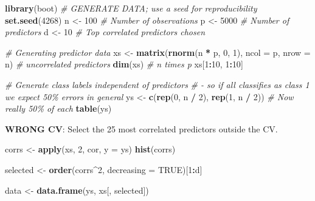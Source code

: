 \documentclass[
]{article}
\newenvironment{Shaded}{\begin{snugshade}}{\end{snugshade}}
\newcommand{\AttributeTok}[1]{\textcolor[rgb]{0.13,0.29,0.53}{#1}}
\newcommand{\CommentTok}[1]{\textcolor[rgb]{0.56,0.35,0.01}{\textit{#1}}}
\newcommand{\ConstantTok}[1]{\textcolor[rgb]{0.56,0.35,0.01}{#1}}
\newcommand{\DecValTok}[1]{\textcolor[rgb]{0.00,0.00,0.81}{#1}}
\newcommand{\FunctionTok}[1]{\textcolor[rgb]{0.13,0.29,0.53}{\textbf{#1}}}
\newcommand{\NormalTok}[1]{#1}
\newcommand{\OtherTok}[1]{\textcolor[rgb]{0.56,0.35,0.01}{#1}}
\newcommand{\SpecialCharTok}[1]{\textcolor[rgb]{0.81,0.36,0.00}{\textbf{#1}}}
\begin{document}
\begin{Shaded}
\begin{Highlighting}[]
\FunctionTok{library}\NormalTok{(boot)}
\CommentTok{\# GENERATE DATA; use a seed for reproducibility}
\FunctionTok{set.seed}\NormalTok{(}\DecValTok{4268}\NormalTok{)}
\NormalTok{n }\OtherTok{\textless{}{-}} \DecValTok{100} \CommentTok{\# Number of observations}
\NormalTok{p }\OtherTok{\textless{}{-}} \DecValTok{5000} \CommentTok{\# Number of predictors}
\NormalTok{d }\OtherTok{\textless{}{-}} \DecValTok{10} \CommentTok{\# Top correlated predictors chosen}

\CommentTok{\# Generating predictor data}
\NormalTok{xs }\OtherTok{\textless{}{-}} \FunctionTok{matrix}\NormalTok{(}\FunctionTok{rnorm}\NormalTok{(n }\SpecialCharTok{*}\NormalTok{ p, }\DecValTok{0}\NormalTok{, }\DecValTok{1}\NormalTok{), }\AttributeTok{ncol =}\NormalTok{ p, }\AttributeTok{nrow =}\NormalTok{ n) }\CommentTok{\# uncorrelated predictors}
\FunctionTok{dim}\NormalTok{(xs) }\CommentTok{\# n times p}
\NormalTok{xs[}\DecValTok{1}\SpecialCharTok{:}\DecValTok{10}\NormalTok{, }\DecValTok{1}\SpecialCharTok{:}\DecValTok{10}\NormalTok{]}

\CommentTok{\# Generate class labels independent of predictors }
\CommentTok{\# {-} so if all classifies as class 1 we expect 50\% errors in general}
\NormalTok{ys }\OtherTok{\textless{}{-}} \FunctionTok{c}\NormalTok{(}\FunctionTok{rep}\NormalTok{(}\DecValTok{0}\NormalTok{, n }\SpecialCharTok{/} \DecValTok{2}\NormalTok{), }\FunctionTok{rep}\NormalTok{(}\DecValTok{1}\NormalTok{, n }\SpecialCharTok{/} \DecValTok{2}\NormalTok{)) }\CommentTok{\# Now really 50\% of each}
\FunctionTok{table}\NormalTok{(ys)}
\end{Highlighting}
\end{Shaded}

\textbf{WRONG CV}: Select the 25 most correlated predictors outside the
CV.

\begin{Shaded}
\begin{Highlighting}[]
\NormalTok{corrs }\OtherTok{\textless{}{-}} \FunctionTok{apply}\NormalTok{(xs, }\DecValTok{2}\NormalTok{, cor, }\AttributeTok{y =}\NormalTok{ ys)}
\FunctionTok{hist}\NormalTok{(corrs)}

\NormalTok{selected }\OtherTok{\textless{}{-}} \FunctionTok{order}\NormalTok{(corrs}\SpecialCharTok{\^{}}\DecValTok{2}\NormalTok{, }\AttributeTok{decreasing =} \ConstantTok{TRUE}\NormalTok{)[}\DecValTok{1}\SpecialCharTok{:}\NormalTok{d]  }

\NormalTok{data }\OtherTok{\textless{}{-}} \FunctionTok{data.frame}\NormalTok{(ys, xs[, selected])}
\end{Highlighting}
\end{Shaded}
\end{document}
